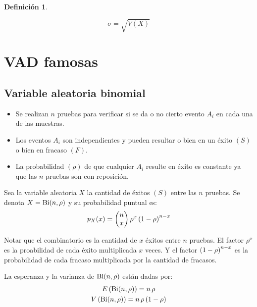 \documentclass[a5paper,12pt,twoside]{book}
\newtheorem{defn}{{Definición}}[chapter]
\begin{document}
\begin{mdframed}[style=DefinitionFrame]
    \begin{defn}
    \end{defn}
    \begin{equation*}
        \sigma = \sqrt{V(X)}
    \end{equation*}
\end{mdframed}


\section{VAD famosas}


\subsection{Variable aleatoria binomial}

\begin{itemize}
\item Se realizan $n$ pruebas para verificar si se da o no cierto evento $A_i$ en cada una de las muestras.

\item Los eventos $A_i$ son independientes y pueden resultar o bien en un éxito $(S)$ o bien en fracaso $(F)$.

\item La probabilidad $(\rho)$ de que cualquier $A_i$ resulte en éxito es constante ya que las $n$ pruebas son con reposición.
\end{itemize}

Sea la variable aleatoria $X$ la cantidad de éxitos $(S)$ entre las $n$ pruebas.
Se denota $X=\operatorname{Bi}(n,\rho)$ y su probabilidad puntual es:
\begin{equation*}
p_X(x) = \begin{pmatrix} {n}\\{x} \end{pmatrix} \rho^x \left(1-\rho\right)^{n-x}
\end{equation*}

Notar que el combinatorio es la cantidad de $x$ éxitos entre $n$ pruebas.
El factor $\rho^x$ es la proabilidad de cada éxito multiplicada $x$ veces.
Y el factor $\left(1-\rho\right)^{n-x}$ es la probabilidad de cada fracaso multiplicada por la cantidad de fracasos.

La esperanza y la varianza de $\operatorname{Bi}(n,\rho)$ están dadas por:
\begin{gather*}
    E \left(\operatorname{Bi}(n,\rho)\right) = n \, \rho
    \\
    V \left(\operatorname{Bi}(n,\rho)\right) = n \, \rho \left(1-\rho\right)
\end{gather*}
\end{document}
